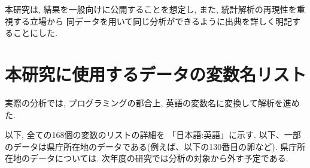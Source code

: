本研究は,
結果を一般向けに公開することを想定し,
また, 統計解析の再現性を重視する立場から
同データを用いて同じ分析ができるように出典を詳しく明記することにした.




%
%
%
%


%
%
%
%







\chapter{本研究に使用するデータの変数名リスト}
\label{datalist}


実際の分析では, プログラミングの都合上,
英語の変数名に変換して解析を進めた.

以下, 全ての168個の変数のリストの詳細を
「日本語:英語」に示す.
以下、一部のデータは県庁所在地のデータである(例えば、以下の130番目の卵など).
県庁所在地のデータについては. 次年度の研究では分析の対象から外す予定である.


%
%
%
%
%
%
%
%
%
%
%
%
%


